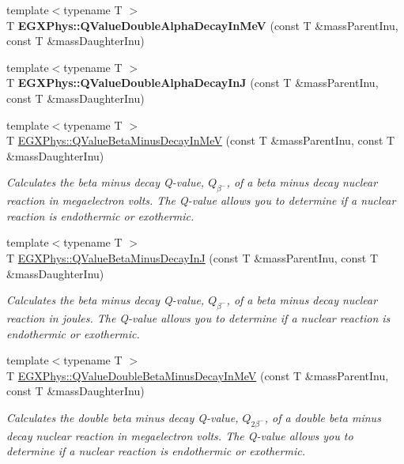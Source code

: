 \begin{DoxyCompactItemize}
{\footnotesize template$<$typename T $>$ }\\T {\bfseries E\+G\+X\+Phys\+::\+Q\+Value\+Double\+Alpha\+Decay\+In\+MeV} (const T \&mass\+Parent\+Inu, const T \&mass\+Daughter\+Inu)
\item 
\mbox{\label{group___q_value_gaefd0ecd4ae3166d18a4748ff540e6bfc}} 
{\footnotesize template$<$typename T $>$ }\\T {\bfseries E\+G\+X\+Phys\+::\+Q\+Value\+Double\+Alpha\+Decay\+InJ} (const T \&mass\+Parent\+Inu, const T \&mass\+Daughter\+Inu)
\item 
{\footnotesize template$<$typename T $>$ }\\T \hyperlink{group___q_value_ga42468e998cf58a027a676755aa1339ba}{E\+G\+X\+Phys\+::\+Q\+Value\+Beta\+Minus\+Decay\+In\+MeV} (const T \&mass\+Parent\+Inu, const T \&mass\+Daughter\+Inu)
\begin{DoxyCompactList}\small\item\em Calculates the beta minus decay Q-\/value, $Q_{\beta^-}$, of a beta minus decay nuclear reaction in megaelectron volts. The Q-\/value allows you to determine if a nuclear reaction is endothermic or exothermic. \end{DoxyCompactList}\item 
{\footnotesize template$<$typename T $>$ }\\T \hyperlink{group___q_value_ga4a2ab24ffb317abc97ce46c92bb64c3c}{E\+G\+X\+Phys\+::\+Q\+Value\+Beta\+Minus\+Decay\+InJ} (const T \&mass\+Parent\+Inu, const T \&mass\+Daughter\+Inu)
\begin{DoxyCompactList}\small\item\em Calculates the beta minus decay Q-\/value, $Q_{\beta^-}$, of a beta minus decay nuclear reaction in joules. The Q-\/value allows you to determine if a nuclear reaction is endothermic or exothermic. \end{DoxyCompactList}\item 
{\footnotesize template$<$typename T $>$ }\\T \hyperlink{group___q_value_ga0eefdd84aa89d210e00dca043368dfeb}{E\+G\+X\+Phys\+::\+Q\+Value\+Double\+Beta\+Minus\+Decay\+In\+MeV} (const T \&mass\+Parent\+Inu, const T \&mass\+Daughter\+Inu)
\begin{DoxyCompactList}\small\item\em Calculates the double beta minus decay Q-\/value, $Q_{2\beta^-}$, of a double beta minus decay nuclear reaction in megaelectron volts. The Q-\/value allows you to determine if a nuclear reaction is endothermic or exothermic. \end{DoxyCompactList}\item 

\end{DoxyCompactItemize}

